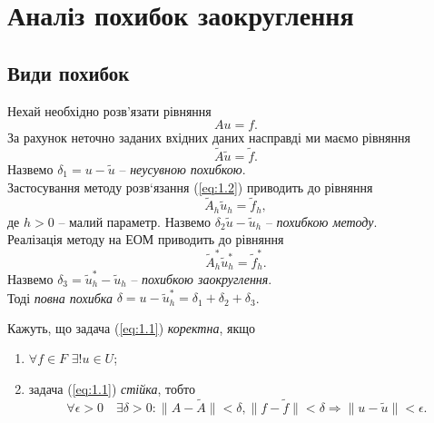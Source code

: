 \section{Аналіз похибок заокруглення}

\subsection{Види похибок}

Нехай необхідно розв’язати рівняння
\begin{equation}
	\label{eq:1.1}
	Au = f.
\end{equation}
За рахунок неточно заданих вхідних даних насправді ми маємо рівняння
\begin{equation}
	\label{eq:1.2}
	\tilde A \tilde u = \tilde f.
\end{equation}
Назвемо $\delta_1 = u - \tilde u$ -- \textit{неусувною похибкою}. \\

Застосування методу розв‘язання (\ref{eq:1.2}) приводить до рівняння
\begin{equation}
	\label{eq:1.3}
	\tilde A_h \tilde u_h = \tilde f_h,
\end{equation}
де $h > 0$ -- малий параметр. Назвемо $\delta_2 \tilde u - \tilde u_h$ -- \textit{похибкою методу}. \\

Реалізація методу на ЕОМ приводить до рівняння
\begin{equation}
	\label{eq:1.4}
	\tilde A_h^* \tilde u_h^* = \tilde f_h^*.
\end{equation}
Назвемо $\delta_3 = \tilde u_h^* - \tilde u_h$ -- \textit{похибкою заокруглення}. \\

Тоді \textit{повна похибка} $\delta = u - \tilde u_h^* = \delta_1 + \delta_2 + \delta_3$. \\

\begin{definition}
	Кажуть, що задача (\ref{eq:1.1}) \textit{коректна}, якщо
	\begin{enumerate}
		\item $\forall f \in F$ $\exists! u \in U$;
		\item задача (\ref{eq:1.1}) \textit{стійка}, тобто
		\[ \forall \epsilon > 0 \quad \exists \delta > 0: \|A-\tilde A\| < \delta, \|f-\tilde f\| < \delta \Rightarrow \|u - \tilde u\| < \epsilon. \]
	\end{enumerate}
\end{definition}

